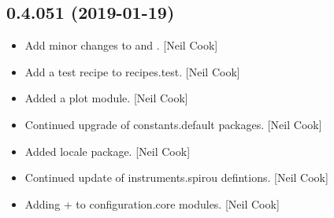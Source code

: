\documentclass[a4paper,10pt,english]{report}
\begin{document}
\subsection{0.4.051 (2019-01-19)}
\label{\detokenize{misc/changelog:id213}}\begin{itemize}
\item {} 
Add minor changes to  and . {[}Neil Cook{]}

\item {} 
Add a test recipe to recipes.test. {[}Neil Cook{]}

\item {} 
Added a plot module. {[}Neil Cook{]}

\item {} 
Continued upgrade of constants.default packages. {[}Neil Cook{]}

\item {} 
Added locale package. {[}Neil Cook{]}

\item {} 
Continued update of instruments.spirou defintions. {[}Neil Cook{]}

\item {} 
Adding  +   to configuration.core modules. {[}Neil
Cook{]}

\end{itemize}
\end{document}
